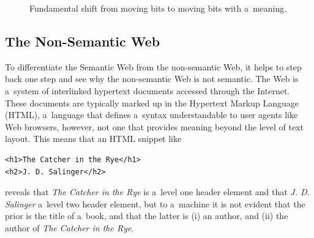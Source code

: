 \begin{figure}[h!]
\begin{center}
  \caption{Fundamental shift from moving bits to moving bits with a~meaning.}
  \label{fig:fundamental-shift}  
\end{center}    
\end{figure}

\subsection{The Non-Semantic Web} \label{sec:non-semantic-web}
To differentiate the Semantic Web from the non-semantic Web,
it helps to step back one step and
see why the non-semantic Web is not semantic.
The Web is a~system of interlinked hypertext documents
accessed through the Internet.
These documents are typically marked up in
the Hypertext Markup Language (HTML),
a~language that defines a~syntax
understandable to user agents like Web browsers,
however, not one that provides meaning
beyond the level of text layout.
This means that an HTML snippet like
\begin{verbatim}
<h1>The Catcher in the Rye</h1>
<h2>J. D. Salinger</h2>
\end{verbatim}
reveals that \emph{The Catcher in the Rye}
is a~level one header element and
that \emph{J. D. Salinger} a~level two header element,
but to a~machine it is not evident that the prior
is the title of a~book,
and that the latter is (i) an author, and (ii)
the author of \emph{The Catcher in the Rye}.

